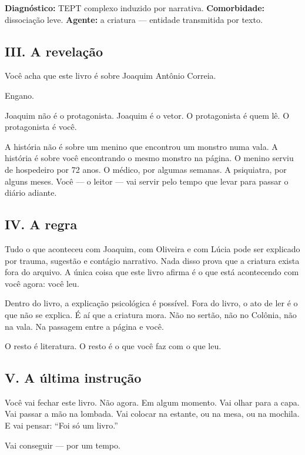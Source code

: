 \noindent \textbf{Diagnóstico:} TEPT complexo induzido por narrativa. \textbf{Comorbidade:} dissociação leve. \textbf{Agente:} a criatura --- entidade transmitida por texto.

\subsection*{III. A revelação}

\noindent Você acha que este livro é sobre Joaquim Antônio Correia.

\noindent Engano.

\noindent Joaquim não é o protagonista. Joaquim é o vetor. O protagonista é quem lê. O protagonista é você.

\noindent A história não é sobre um menino que encontrou um monstro numa vala. A história é sobre você encontrando o mesmo monstro na página. O menino serviu de hospedeiro por 72 anos. O médico, por algumas semanas. A psiquiatra, por alguns meses. Você --- o leitor --- vai servir pelo tempo que levar para passar o diário adiante.

\subsection*{IV. A regra}

\noindent Tudo o que aconteceu com Joaquim, com Oliveira e com Lúcia pode ser explicado por trauma, sugestão e contágio narrativo. Nada disso prova que a criatura exista fora do arquivo. A única coisa que este livro afirma é o que está acontecendo com você agora: você leu.

\noindent Dentro do livro, a explicação psicológica é possível. Fora do livro, o ato de ler é o que não se explica. É aí que a criatura mora. Não no sertão, não no Colônia, não na vala. Na passagem entre a página e você.

\noindent O resto é literatura. O resto é o que você faz com o que leu.

\subsection*{V. A última instrução}

\noindent Você vai fechar este livro. Não agora. Em algum momento. Vai olhar para a capa. Vai passar a mão na lombada. Vai colocar na estante, ou na mesa, ou na mochila. E vai pensar: ``Foi só um livro.''

\noindent Vai conseguir --- por um tempo.

